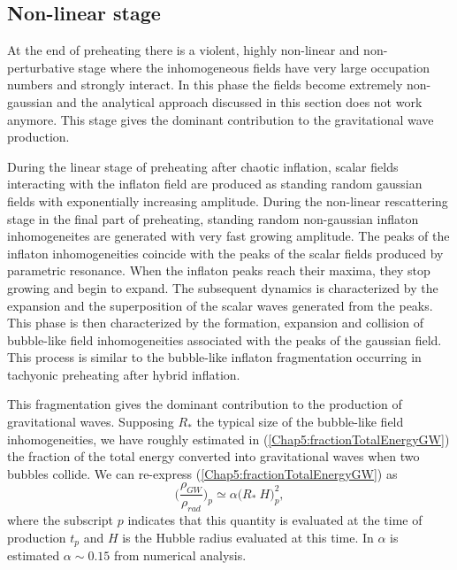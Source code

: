 \documentclass[11pt,a4paper,twoside]{book}
\begin{document}
\subsection{Non-linear stage}
At the end of preheating there is a violent, highly non-linear and non-perturbative stage where the inhomogeneous fields have very large occupation numbers and strongly interact. In this phase the fields become extremely non-gaussian and the analytical approach discussed in this section does not work anymore. This stage gives the dominant contribution to the gravitational wave production.

During the linear stage of preheating after chaotic inflation, scalar fields interacting with the inflaton field are produced as standing random gaussian fields with exponentially increasing amplitude. During the non-linear rescattering stage in the final part of preheating, standing random non-gaussian inflaton inhomogeneites are generated with very fast growing amplitude. The peaks of the inflaton inhomogeneities coincide with the peaks of the scalar fields produced by parametric resonance. When the inflaton peaks  reach their maxima, they stop growing and begin to expand. The subsequent dynamics is characterized by the expansion and the superposition of the scalar waves generated from the peaks. This phase is then characterized by the formation, expansion  and collision of bubble-like field inhomogeneities associated with the peaks of the gaussian field. This process is similar to the bubble-like inflaton fragmentation occurring in tachyonic preheating after hybrid inflation.

This fragmentation gives the dominant contribution to the production of gravitational waves. Supposing $ R_{*} $ the typical size of the bubble-like field inhomogeneities, we have roughly estimated in  (\ref{Chap5:fractionTotalEnergyGW}) the fraction of the total energy converted into gravitational waves when two bubbles collide. We can re-express (\ref{Chap5:fractionTotalEnergyGW}) as
\begin{equation}
	\label{Chap7:fractionTotalEnergyGW}
	\Bigg(\frac{\rho_{GW}}{\rho_{rad}}\Bigg)_{p} \simeq  \alpha \Big( R_{*}\ H\Big)_{p}^{2},
\end{equation}
where the subscript $ p $ indicates that this quantity is evaluated at the time of production $ t_{p} $ and $ H $ is the Hubble radius evaluated at this time. In \cite{Chap7:GreenMethod} $\alpha$ is estimated $\alpha \sim 0.15$ from numerical analysis.
\end{document}
